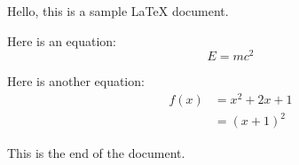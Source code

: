 \documentclass{article}
\begin{document}
Hello, this is a sample \LaTeX{} document.

Here is an equation:
\[ E = mc^2 \]

Here is another equation:
\begin{align*}
  f(x) &= x^2 + 2x + 1 \\
  &= (x+1)^2
\end{align*}

This is the end of the document.
\end{document}
